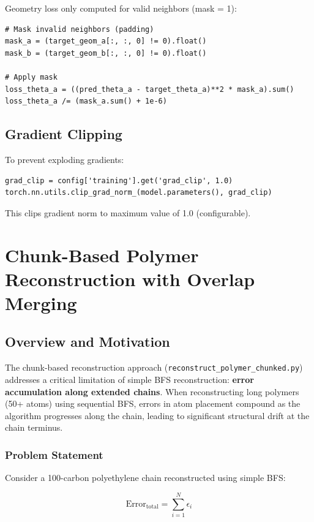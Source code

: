 \documentclass[11pt,a4paper]{article}
\begin{document}
Geometry loss only computed for valid neighbors (mask = 1):

\begin{lstlisting}
# Mask invalid neighbors (padding)
mask_a = (target_geom_a[:, :, 0] != 0).float()
mask_b = (target_geom_b[:, :, 0] != 0).float()

# Apply mask
loss_theta_a = ((pred_theta_a - target_theta_a)**2 * mask_a).sum()
loss_theta_a /= (mask_a.sum() + 1e-6)
\end{lstlisting}

\subsection{Gradient Clipping}

To prevent exploding gradients:

\begin{lstlisting}
grad_clip = config['training'].get('grad_clip', 1.0)
torch.nn.utils.clip_grad_norm_(model.parameters(), grad_clip)
\end{lstlisting}

This clips gradient norm to maximum value of 1.0 (configurable).

\clearpage

\section{Chunk-Based Polymer Reconstruction with Overlap Merging}

\subsection{Overview and Motivation}

The chunk-based reconstruction approach (\texttt{reconstruct\_polymer\_chunked.py}) addresses a critical limitation of simple BFS reconstruction: \textbf{error accumulation along extended chains}. When reconstructing long polymers (50+ atoms) using sequential BFS, errors in atom placement compound as the algorithm progresses along the chain, leading to significant structural drift at the chain terminus.

\subsubsection{Problem Statement}

Consider a 100-carbon polyethylene chain reconstructed using simple BFS:

\begin{equation}
\text{Error}_{\text{total}} = \sum_{i=1}^{N} \epsilon_i
\end{equation}
\end{document}
